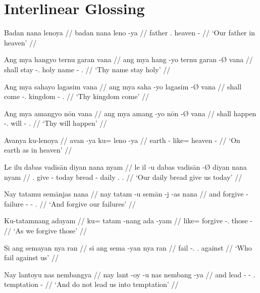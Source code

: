\documentclass[12pt,paper=a4]{scrartcl}
\begin{document}
\section{Interlinear Glossing}

\ex %
\begingl
    \glpreamble Badan nana lenoya //
    \gla badan nana leno -ya //
    \glb father \Fpl{}.\Gen{} heaven -\Loc{} //
    \glft `Our father in heaven' //
\endgl
\xe

\ex %
\begingl
    \glpreamble Ang mya hangyo ternu garan vana //
    \gla ang mya hang -yo ternu garan -Ø vana //
    \glb \AgtT{} shall stay -\Tsg{}.\N{} holy name -\Top{} \Ssg{}.\Gen{} //
    \glft `Thy name stay holy' //
\endgl
\xe

\ex %
\begingl
    \glpreamble Ang mya sahayo lagasim vana //
    \gla ang mya saha -yo lagasim -Ø vana //
    \glb \AgtT{} shall come -\Tsg{}.\N{} kingdom -\Top{} \Ssg{}.\Gen{} //
    \glft `Thy kingdom come' //
\endgl
\xe

\ex %
\begingl
    \glpreamble Ang mya amangyo nōn vana //
    \gla ang mya amang -yo nōn -Ø vana //
    \glb \AgtT{} shall happen -\Tsg{}.\N{} will -\Top{} \Ssg{}.\Gen{} //
    \glft `Thy will happen' //
\endgl
\xe

\ex %
\begingl
    \glpreamble Avanya ku-lenoya //
    \gla avan -ya ku= leno -ya //
    \glb earth -\Loc{} like= heaven -\Loc{} //
    \glft `On earth as in heaven' //
\endgl
\xe

\ex %
\begingl
    \glpreamble Le ilu dabas vadisān diyan nana nyam //
    \gla le il -u dabas vadisān -Ø diyan nana nyam //
    \glb \PatT{}.\Inan{} give -\Imp{} today bread -\Top{} daily \Fpl{}.\Gen{} \Fpl{}.\Dat{} //
    \glft `Our daily bread give us today' //
\endgl
\xe

\ex %
\begingl
    \glpreamble Nay tatamu semānjas nana //
    \gla nay tatam -u semān -j -as nana //
    \glb and forgive -\Imp{} failure -\Pl{} -\Parg{} \Fpl{}.\Gen{} //
    \glft `And forgive our failures' //
\endgl
\xe

\ex %
\begingl
    \glpreamble Ku-tatamnang adayam //
    \gla ku= tatam -nang ada -yam //
    \glb like= forgive -\Fpl{}.\Aarg{} those -\Dat{} //
    \glft `As we forgive those' //
\endgl
\xe

\ex %
\begingl
    \glpreamble Si ang semayan nya ran //
    \gla si ang sema -yan nya ran //
    \glb \Rel{} \AgtT{} fail -\Tpl{}.\M{} \Fpl{}.\Loc{} against //
    \glft `Who fail against us' //
\endgl
\xe

\ex %
\begingl
    \glpreamble Nay lantoyu nas nembangya //
    \gla nay lant -oy -u nas nembang -ya //
    \glb and lead -\Neg{} -\Imp{} \Fpl{}.\Parg{} temptation -\Loc{} //
    \glft `And do not lead us into temptation' //
\endgl
\xe
\end{document}
